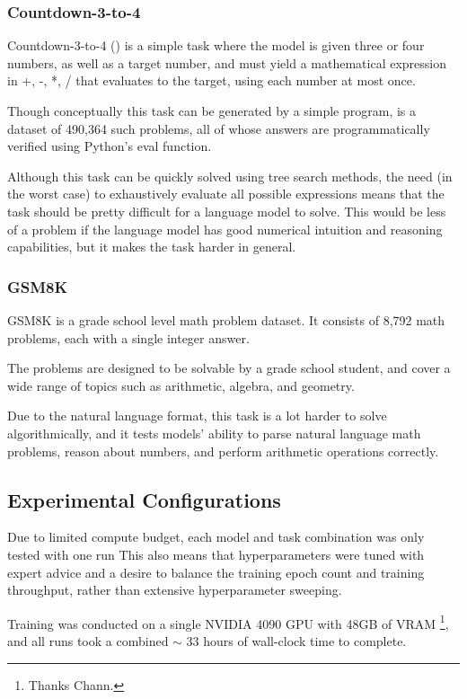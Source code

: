\documentclass{article} %
\theoremstyle{definition}
\begin{document}
\subsubsection{Countdown-3-to-4}
Countdown-3-to-4 (\cite{countdown}) is a simple task where the model is given three or four numbers, as well as a target number,
and must yield a mathematical expression in +, -, *, / that evaluates to the target, using each number at most once.

Though conceptually this task can be generated by a simple program,
\cite{countdown} is a dataset of 490,364 such problems, all of whose answers
are programmatically verified using Python's eval function.

Although this task can be quickly solved using tree search methods,
the need (in the worst case) to exhaustively evaluate all possible expressions
means that the task should be pretty difficult for a language model to solve.
This would be less of a problem if the language model has good numerical intuition
and reasoning capabilities, but it makes the task harder in general.

\subsubsection{GSM8K}
GSM8K is a grade school level math problem dataset.
It consists of 8,792 math problems, each with a single integer answer.

The problems are designed to be solvable by a grade school student, 
and cover a wide range of topics such as arithmetic, algebra, and geometry.

Due to the natural language format, this task is a lot harder to solve algorithmically, and it tests models' ability to parse 
natural language math problems, reason about numbers, and perform arithmetic operations correctly.

\subsection{Experimental Configurations}

Due to limited compute budget, each model and task combination was only tested with one run
This also means that hyperparameters were tuned with expert advice and
a desire to balance the training epoch count and training throughput, 
rather than extensive hyperparameter sweeping.

Training was conducted on a single NVIDIA 4090 GPU with 48GB of VRAM \footnote{
    Thanks Chann.
}, and all runs took a combined $\sim$ 33 hours of wall-clock time to complete.
\end{document}

